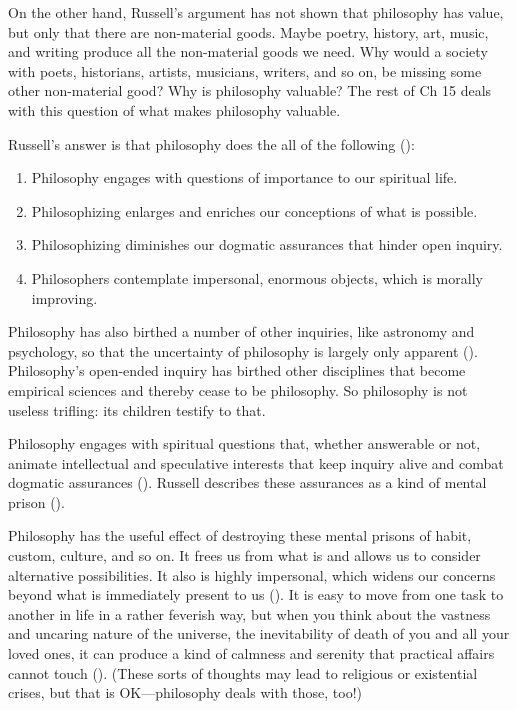 \documentclass[oneside,letterpaper,12pt]{book}
\begin{document}
On the other hand, Russell's argument has not shown that philosophy has value, but only that there are non-material goods. Maybe poetry, history, art, music, and writing produce all the non-material goods we need. Why would a society with poets, historians, artists, musicians, writers, and so on, be missing some other non-material good? Why is philosophy valuable? The rest of Ch 15 deals with this question of what makes philosophy valuable.

Russell's answer is that philosophy does the all of the following (\pageref{philosophy}):
\begin{enumerate}
	\item Philosophy engages with questions of importance to our spiritual life.
	\item Philosophizing enlarges and enriches our conceptions of what is possible.
	\item Philosophizing diminishes our dogmatic assurances that hinder open inquiry.
	\item Philosophers contemplate impersonal, enormous objects, which is morally improving.
\end{enumerate}
Philosophy has also birthed a number of other inquiries, like astronomy and psychology, so that the uncertainty of philosophy is largely only apparent (\pageref{apparent}). Philosophy's open-ended inquiry has birthed other disciplines that become empirical sciences and thereby cease to be philosophy. So philosophy is not useless trifling: its children testify to that.

Philosophy engages with spiritual questions that, whether answerable or not, animate intellectual and speculative interests that keep inquiry alive and combat dogmatic assurances (\pageref{antidogma}). Russell describes these assurances as a kind of mental prison (\pageref{prison}).

Philosophy has the useful effect of destroying these mental prisons of habit, custom, culture, and so on. It frees us from what is and allows us to consider alternative possibilities. It also is highly impersonal, which widens our concerns beyond what is immediately present to us (\pageref{impersonal}). It is easy to move from one task to another in life in a rather feverish way, but when you think about the vastness and uncaring nature of the universe, the inevitability of death of you and all your loved ones, it can produce a kind of calmness and serenity that practical affairs cannot touch (\pageref{serenity}). (These sorts of thoughts may lead to religious or existential crises, but that is OK---philosophy deals with those, too!)
\end{document}
